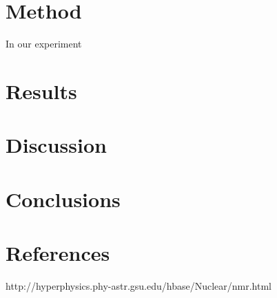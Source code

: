 \documentclass[11pt,a4paper, 
english, swedish %
]{article}
\begin{document}
\section{Method}

In our experiment 
\section{Results}

\section{Discussion}

\section{Conclusions}

\section{References}

http://hyperphysics.phy-astr.gsu.edu/hbase/Nuclear/nmr.html

















\clearpage %
\appendix  %


\end{document}
